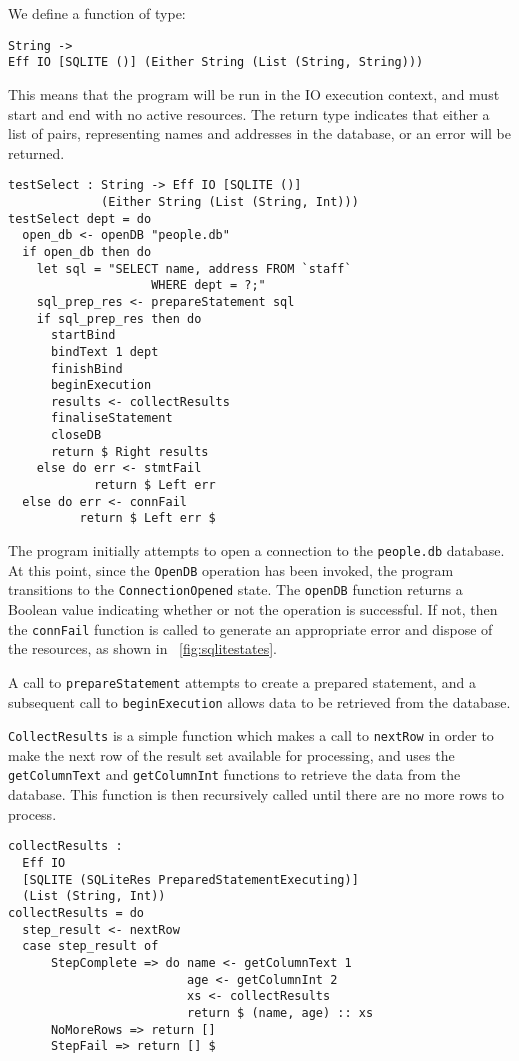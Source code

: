 \documentclass[preprint]{sigplanconf}
\begin{document}
We define a function of type:
{\small
\begin{verbatim}
String ->
Eff IO [SQLITE ()] (Either String (List (String, String)))
\end{verbatim}
}
This means that the program will be run in the IO execution context, and must start and end with no active resources. The return type indicates that either a list of  pairs, representing names and addresses in the database, or an error will be returned. 
{\small
\begin{verbatim}
testSelect : String -> Eff IO [SQLITE ()] 
             (Either String (List (String, Int)))
testSelect dept = do
  open_db <- openDB "people.db"
  if open_db then do
    let sql = "SELECT name, address FROM `staff` 
                    WHERE dept = ?;"
    sql_prep_res <- prepareStatement sql
    if sql_prep_res then do 
      startBind
      bindText 1 dept
      finishBind
      beginExecution
      results <- collectResults
      finaliseStatement
      closeDB
      return $ Right results
    else do err <- stmtFail
            return $ Left err
  else do err <- connFail
          return $ Left err $
\end{verbatim}
}
The program initially attempts to open a connection to the \texttt{people.db} database. At this point, since the \texttt{OpenDB} operation has been invoked, the program transitions to the \texttt{ConnectionOpened} state. The \texttt{openDB} function returns a Boolean value indicating whether or not the operation is successful. If not, then the \texttt{connFail} function is called to generate an appropriate error and dispose of the resources, as shown in ~\ref{fig:sqlitestates}.

A call to \texttt{prepareStatement} attempts to create a prepared statement, and a subsequent call to \texttt{beginExecution} allows data to be retrieved from the database.

\texttt{CollectResults} is a simple function which makes a call to \texttt{nextRow} in order to make the next row of the result set available for processing, and uses the \texttt{getColumnText} and \texttt{getColumnInt} functions to retrieve the data from the database. This function is then recursively called until there are no more rows to process.
{\small
\begin{verbatim}
collectResults : 
  Eff IO 
  [SQLITE (SQLiteRes PreparedStatementExecuting)] 
  (List (String, Int))
collectResults = do
  step_result <- nextRow
  case step_result of
      StepComplete => do name <- getColumnText 1
                         age <- getColumnInt 2
                         xs <- collectResults
                         return $ (name, age) :: xs
      NoMoreRows => return []
      StepFail => return [] $
\end{verbatim}
}
\end{document}
